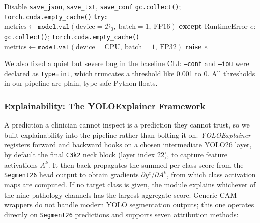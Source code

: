 \documentclass[conference]{IEEEtran}
\begin{document}
\begin{algorithm}[htbp]
\caption{Self-Healing Memory-Safe Validation}
\label{alg:selfheal}
\begin{algorithmic}[1]
\STATE Disable \texttt{save\_json}, \texttt{save\_txt}, \texttt{save\_conf}
\STATE \texttt{gc.collect()}; \texttt{torch.cuda.empty\_cache()}
\STATE \textbf{try:} $\text{metrics} \leftarrow \texttt{model.val}(\text{device}=\mathcal{D}_0,\ \text{batch}=1,\ \text{FP16})$
\STATE \textbf{except} RuntimeError $e$:
\STATE \texttt{gc.collect()}; \texttt{torch.cuda.empty\_cache()}
\STATE $\text{metrics} \leftarrow \texttt{model.val}(\text{device}=\text{CPU},\ \text{batch}=1,\ \text{FP32})$
\ELSE
\STATE \textbf{raise} $e$
\ENDIF
\end{algorithmic}
\end{algorithm}

We also fixed a quiet but severe bug in the baseline CLI: \texttt{--conf} and \texttt{--iou} were declared as \texttt{type=int}, which truncates a threshold like 0.001 to 0. All thresholds in our pipeline are plain, type-safe Python floats.

\subsubsection{Explainability: The YOLOExplainer Framework}
A prediction a clinician cannot inspect is a prediction they cannot trust, so we built explainability into the pipeline rather than bolting it on. \textit{YOLOExplainer} registers forward and backward hooks on a chosen intermediate YOLO26 layer, by default the final \texttt{C3k2} neck block (layer index 22), to capture feature activations $A^k$. It then back-propagates the summed per-class score from the \texttt{Segment26} head output to obtain gradients $\partial y^c / \partial A^k$, from which class activation maps are computed. If no target class is given, the module explains whichever of the nine pathology channels has the largest aggregate score. Generic CAM wrappers do not handle modern YOLO segmentation outputs; this one operates directly on \texttt{Segment26} predictions and supports seven attribution methods:
\end{document}
